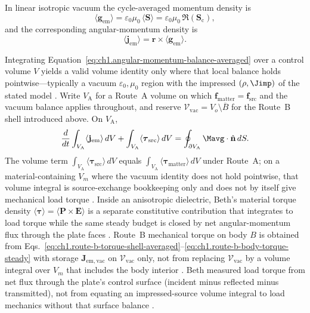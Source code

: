 In linear isotropic vacuum the cycle-averaged momentum density is
\begin{equation}
\label{eq:ch1.rotation-generator-split}
\langle\mathbf{g}_{\mathrm{em}}\rangle=\varepsilon_0\mu_0\,\langle\mathbf{S}\rangle
=\varepsilon_0\mu_0\,\Re(\mathbf{S}_\mathrm{c}),
\end{equation}
and the corresponding angular-momentum density is
\begin{equation}
\label{eq:ch1.angular-momentum-density}
\langle\mathbf{j}_{\mathrm{em}}\rangle=\mathbf{r}\times\langle\mathbf{g}_{\mathrm{em}}\rangle.
\end{equation}
\addtocounter{equation}{-1}\label{eq:ch1.angular-density-split}%

Integrating Equation~\eqref{eq:ch1.angular-momentum-balance-averaged} over a control volume $V$ yields a valid volume identity only where that local balance holds pointwise---typically a vacuum $\varepsilon_0,\mu_0$ region with the impressed $(\rho,\Jimp)$ of the stated model \cite{stratton1941}. Write $V_{\mathrm{A}}$ for a Route~A volume on which $\mathbf{f}_{\mathrm{matter}}=\mathbf{f}_{\mathrm{src}}$ and the vacuum balance applies throughout, and reserve $\mathcal{V}_{\mathrm{vac}}=V_o\setminus\overline{B}$ for the Route~B shell introduced above. On $V_{\mathrm{A}}$,
\begin{equation}
\label{eq:ch1.angular-balance-integral}
\frac{d}{dt}\int_{V_{\mathrm{A}}} \langle\mathbf{j}_{\mathrm{em}}\rangle\,dV
+\int_{V_{\mathrm{A}}} \langle\boldsymbol{\tau}_{\mathrm{src}}\rangle\,dV
=\oint_{\partial V_{\mathrm{A}}}\Mavg\cdot\hat{\mathbf{n}}\,dS.
\end{equation}
The volume term $\int_{V_{\mathrm{A}}}\langle\boldsymbol{\tau}_{\mathrm{src}}\rangle\,dV$ equals $\int_{V_{\mathrm{A}}}\langle\boldsymbol{\tau}_{\mathrm{matter}}\rangle\,dV$ under Route~A; on a material-containing $V_m$ where the vacuum identity does not hold pointwise, that volume integral is source-exchange bookkeeping only and does not by itself give mechanical load torque \cite{stratton1941}. Inside an anisotropic dielectric, Beth's material torque density $\langle\boldsymbol\tau\rangle=\langle\mathbf P\times\mathbf E\rangle$ is a separate constitutive contribution that integrates to load torque while the same steady budget is closed by net angular-momentum flux through the plate faces \cite{beth1936,stratton1941}. Route~B mechanical torque on body $B$ is obtained from Eqs.~\eqref{eq:ch1.route-b-torque-shell-averaged}--\eqref{eq:ch1.route-b-body-torque-steady} with storage $\mathbf{J}_{\mathrm{em,vac}}$ on $\mathcal{V}_{\mathrm{vac}}$ only, not from replacing $\mathcal{V}_{\mathrm{vac}}$ by a volume integral over $V_m$ that includes the body interior \cite{harrington2001}. Beth \cite{beth1936} measured load torque from net flux through the plate's control surface (incident minus reflected minus transmitted), not from equating an impressed-source volume integral to load mechanics without that surface balance \cite{stratton1941,beth1936}.

